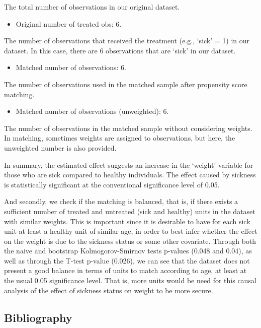 \documentclass[
]{article}
\providecommand{\tightlist}{%
  \setlength{\itemsep}{0pt}\setlength{\parskip}{0pt}}
\begin{document}
The total number of observations in our original dataset.

\begin{itemize}
\tightlist
\item
  Original number of treated obs: 6.
\end{itemize}

The number of observations that received the treatment (e.g., `sick' =
1) in our dataset. In this case, there are 6 observations that are
`sick' in our dataset.

\begin{itemize}
\tightlist
\item
  Matched number of observations: 6.
\end{itemize}

The number of observations used in the matched sample after propensity
score matching.

\begin{itemize}
\tightlist
\item
  Matched number of observations (unweighted): 6.
\end{itemize}

The number of observations in the matched sample without considering
weights. In matching, sometimes weights are assigned to observations,
but here, the unweighted number is also provided.

In summary, the estimated effect suggests an increase in the `weight'
variable for those who are sick compared to healthy individuals. The
effect caused by sickness is statistically significant at the
conventional significance level of 0.05.

And secondly, we check if the matching is balanced, that is, if there
exists a sufficient number of treated and untreated (sick and healthy)
units in the dataset with similar weights. This is important since it is
desirable to have for each sick unit at least a healthy unit of similar
age, in order to best infer whether the effect on the weight is due to
the sickness status or some other covariate. Through both the naive and
bootstrap Kolmogorov-Smirnov tests p-values (0.048 and 0.04), as well as
through the T-test p-value (0.026), we can see that the dataset does not
present a good balance in terms of units to match according to age, at
least at the usual 0.05 significance level. That is, more units would be
need for this causal analysis of the effect of sickness status on weight
to be more secure.

\hypertarget{bibliography}{%
\subsection{Bibliography}\label{bibliography}}
\end{document}
